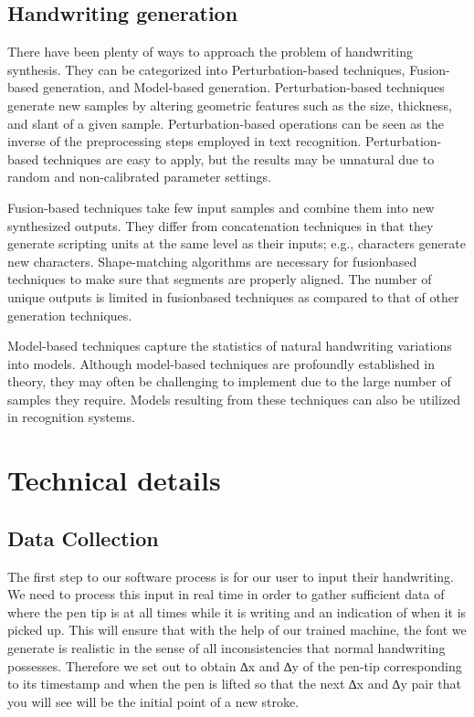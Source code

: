 \documentclass{article} %
\begin{document}
\subsection{Handwriting generation} %
There have been plenty of ways to approach the problem of handwriting synthesis. They can be categorized into Perturbation-based techniques, Fusion-based generation, and Model-based generation. 
Perturbation-based techniques generate new samples by
altering geometric features such as the size, thickness, and
slant of a given sample. Perturbation-based operations can
be seen as the inverse of the preprocessing steps employed
in text recognition. Perturbation-based techniques are easy
to apply, but the results may be unnatural due to random and
non-calibrated parameter settings. 

Fusion-based techniques take few input samples and combine
them into new synthesized outputs. They differ from concatenation
techniques in that they generate scripting units at the
same level as their inputs; e.g., characters generate new characters.
Shape-matching algorithms are necessary for fusionbased
techniques to make sure that segments are properly
aligned. The number of unique outputs is limited in fusionbased
techniques as compared to that of other generation
techniques.

Model-based techniques capture the statistics of natural
handwriting variations into models. Although model-based
techniques are profoundly established in theory, they may
often be challenging to implement due to the large number
of samples they require. Models resulting from
these techniques can also be utilized in recognition systems. 


\section{Technical details}
\subsection{Data Collection}

The first step to our software process is for our user to input their handwriting. We need to process this input in real time in order to gather sufficient data of where the pen tip is at all times while it is writing and an indication of when it is picked up. This will ensure that with the help of our trained machine, the font we generate is realistic in the sense of all inconsistencies that normal handwriting possesses. Therefore we set out to obtain ∆x and ∆y of the pen-tip corresponding to its timestamp and when the pen is lifted so that the next ∆x and ∆y pair that you will see will be the initial point of a new stroke. 
\end{document}
